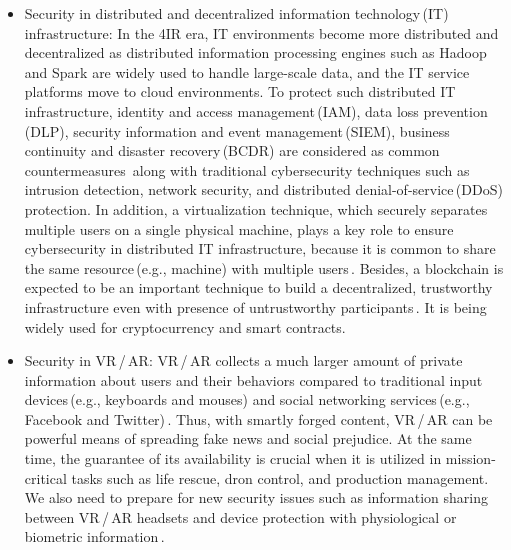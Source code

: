 \documentclass[11pt]{article}
\begin{document}
\begin{itemize}
  \item Security in distributed and decentralized information technology\,(IT) infrastructure: In the 4IR era, IT environments become more distributed and decentralized as distributed information processing engines such as Hadoop and Spark are widely used to handle large-scale data, and the IT service platforms move to cloud environments. 
  To protect such distributed IT infrastructure, identity and access management\,(IAM), data loss prevention\,(DLP), security information and event management\,(SIEM), business continuity and disaster recovery\,(BCDR) are considered as common countermeasures\,\cite{cloudSecurity} along with traditional cybersecurity techniques such as intrusion detection, network security, and distributed denial-of-service\,(DDoS) protection.
  In addition, a virtualization technique, which securely separates multiple users on a single physical machine, plays a key role to ensure cybersecurity in distributed IT infrastructure, because it is common to share the same resource\,(e.g., machine) with multiple users\,\cite{Darshan2020}. 
Besides, a blockchain is expected to be an important technique to build a decentralized, trustworthy infrastructure even with presence of untrustworthy participants\,\cite{blockchain}. It is being widely used for cryptocurrency and smart contracts.

  \item Security in VR\,/\,AR: %
  VR\,/\,AR collects a much larger amount of private information about users and their behaviors compared to traditional input devices\,(e.g., keyboards and mouses) and social networking services\,(e.g., Facebook and Twitter)\,\cite{SecurityARVR}. Thus, with smartly forged content, VR\,/\,AR can be powerful means of spreading fake news and social prejudice. At the same time, the guarantee of its availability is crucial when it is utilized in mission-critical tasks such as life rescue, dron control, and production management. We also need to prepare for new security issues such as information sharing between VR\,/\,AR headsets and device protection with physiological or biometric information\,\cite{Guzman2019}.
\end{itemize}
\end{document}
